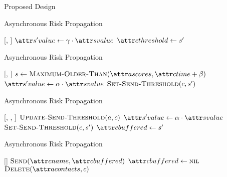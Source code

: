 \documentclass[11pt]{beamer}
\begin{document}
\begin{section}{Proposed Design}
\begin{frame}{Asynchronous Risk Propagation}
\begin{function}{\nSetSendThreshold}[\vContact, \vScore]
  \State $\aNewScoreValue \assign \pSendCoefficient \cdot \aScoreValue$
  \pause
  \State $\aContactThreshold \assign \vNewScore$
\end{function}
\end{frame}

\begin{frame}{Asynchronous Risk Propagation}
\begin{function}{\nUpdateSendThreshold}[\vActor, \vContact]
    \pause
      \pause
      \State $\vScore \assign \cMaximumOlderThan[\aActorScores, \aContactTime + \pTimeBuffer]$
        \pause
      \State $\aNewScoreValue \assign \pTransmissionRate \cdot \aScoreValue$
        \pause
      \State $\cSetSendThreshold[\vContact, \vNewScore]$
    \EndIf
  \EndIf
\end{function}
\end{frame}

\begin{frame}{Asynchronous Risk Propagation}
\begin{function}{\nApplyRiskScore}[\vActor, \vContact, \vScore]
  \State $\cUpdateSendThreshold[\vActor, \vContact]$
  \pause
  \If{$\aContactThresholdValue < \aScoreValue \AND \aContactTime + \pTimeBuffer > \aScoreTime$}
    \pause
    \State $\aNewScoreValue \assign \pTransmissionRate \cdot \aScoreValue$
    \pause
    \State $\cSetSendThreshold[\vContact, \vNewScore]$
    \pause
    \State $\aContactBuffered \assign \vNewScore$
  \EndIf
\end{function}
\end{frame}

\begin{frame}{Asynchronous Risk Propagation}
\begin{function}{\nHandleFlushTimeout}[\vActor]
  \ForEach{$\vContact \in \aActorContacts$}
    \pause
    \If{$\aContactBuffered \notEquals \nil$}
      \pause
      \State $\cSend[\aContactName, \aContactBuffered]$
      \pause
      \State $\aContactBuffered \assign \nil$
    \EndIf
    \pause
      \State $\cDelete[\aActorContacts, \vContact]$
    \EndIf
  \EndFor
\end{function}
\end{frame}


\end{section}
\end{document}
